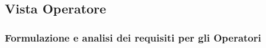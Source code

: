 \documentclass{article}
\begin{document}
\begin{center}
    
\end{center}











\newpage
\subsection{Vista Operatore}
\subsubsection{Formulazione e analisi dei requisiti per gli Operatori}
\end{document}
